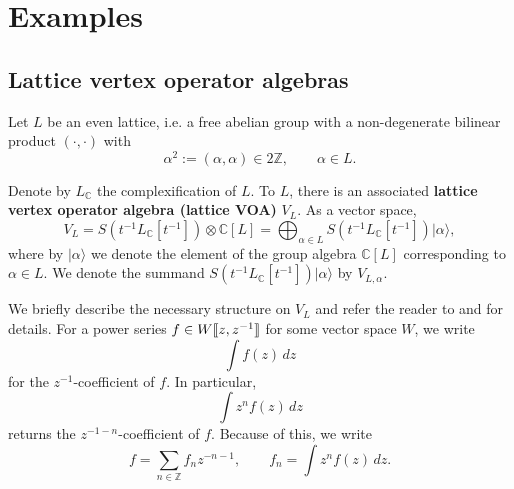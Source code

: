 \documentclass[11pt]{amsart}
\newcommand{\ket}[1]{|#1\rangle}
\newcommand{\ch}{\operatorname{ch}}
\newcommand{\C}{\mathbb{C}}
\newcommand{\Z}{\mathbb{Z}}
\newcommand{\g}{\mathfrak{g}}
\newcommand{\jet}[1]{[\hspace{-0.5mm}[{#1}]\hspace{-0.5mm}]}
\numberwithin{equation}{section}
\theoremstyle{plain}
\newtheorem{lemma}[theorem]{Lemma}
\newtheorem{conjecture}[theorem]{Conjecture}
\theoremstyle{definition}
\begin{document}








\section{Examples}\label{s:examples}
\subsection{Lattice vertex operator algebras}
Let $L$ be an even lattice, i.e. a free abelian group with a non-degenerate bilinear product $(\cdot,\cdot)$ with
$$
\alpha^2:=(\alpha,\alpha)\in2\Z,\qquad \alpha\in L.
$$

Denote by $L_\C$ the complexification of $L$. To $L$, there is an associated {\bfseries lattice vertex operator algebra (lattice VOA)} $V_L$. As a vector space,
$$
V_L=S(t^{-1}L_\C[t^{-1}])\otimes \C[L]=\bigoplus_{\alpha\in L}S(t^{-1}L_\C[t^{-1}])\ket\alpha,
$$
where by $\ket\alpha$ we denote the element of the group algebra $\C[L]$ corresponding to $\alpha\in L$. We denote the summand $S(t^{-1}L_\C[t^{-1}])\ket\alpha$ by $V_{L,\alpha}$.

We briefly describe the necessary structure on $V_L$ and refer the reader to \cite[Section 5.4]{FBZ04} and \cite[Section 5]{Kac98} for details. For a power series $f\in W\jet{z,z^{-1}}$ for some vector space $W$, we write
$$
\int f(z)\,dz
$$
for the $z^{-1}$-coefficient of $f$. In particular,
$$
\int z^nf(z)\,dz
$$
returns the $z^{-1-n}$-coefficient of $f$. Because of this, we write
$$
f=\sum_{n\in\Z}f_{n}z^{-n-1},\qquad f_n=\int z^nf(z)\,dz.
$$
\end{document}
